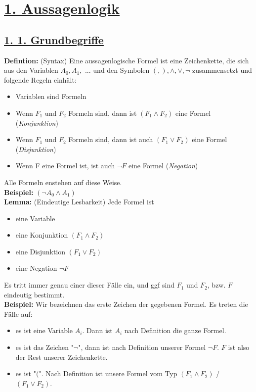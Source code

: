 \documentclass{scrartcl}
\begin{document}
\section*{\underline{1. Aussagenlogik}}

\subsection*{\underline{1. 1. Grundbegriffe}}
\textbf{Defintion:} (Syntax) Eine aussagenlogische Formel ist eine Zeichenkette, die sich aus den Variablen $A_0, A_1,$ ... und den Symbolen $(, ), \wedge, \vee, \neg$ zusammensetzt und folgende Regeln einh\"alt:
\begin{itemize}
\item Variablen sind Formeln 
\item Wenn $F_1$ und $F_2$ Formeln sind, dann ist $(F_1 \wedge F_2)$ eine Formel (\textit{Konjunktion})
\item Wenn $F_1$ und $F_2$ Formeln sind, dann ist auch $(F_1 \vee F_2)$ eine Formel (\textit{Disjunktion})
\item Wenn F eine Formel ist, ist auch $\neg F$ eine Formel (\textit{Negation})
\end{itemize}
Alle Formeln enstehen auf diese Weise.\\
\textbf{Beispiel:} $(\neg A_0 \wedge A_1)$\\
\textbf{Lemma:} (Eindeutige Lesbarkeit) Jede Formel ist
\begin{itemize}
\item eine Variable
\item eine Konjunktion $(F_1 \wedge F_2)$
\item eine Disjunktion $(F_1 \vee F_2)$
\item eine Negation $\neg F$
\end{itemize}
Es tritt immer genau einer dieser F\"alle ein, und ggf sind $F_1$ und $F_2$, bzw. $F$ eindeutig bestimmt.\\
\textbf{Beispiel:} Wir bezeichnen das erste Zeichen der gegebenen Formel. Es treten die Fälle auf:
\begin{itemize}
\item es ist eine Variable $A_i$. Dann ist $A_i$ nach Definition die ganze Formel.
\item es ist das Zeichen "$\neg$", dann ist nach Definition unserer Formel $\neg F$. $F$ ist also der Rest unserer Zeichenkette.
\item es ist "$($". Nach Definition ist unsere Formel vom Typ $(F_1 \wedge F_2)$ / $(F_1 \vee F_2)$.
\end{itemize}
\end{document}
